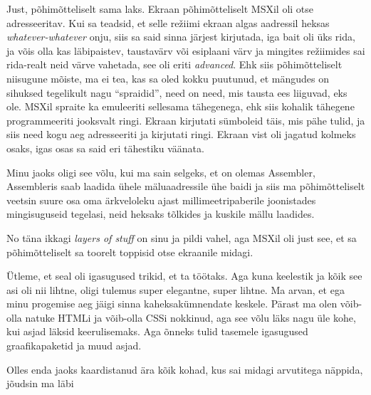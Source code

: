 Just, põhimõtteliselt sama laks. Ekraan põhimõtteliselt MSXil oli otse adresseeritav. Kui sa teadsid, et selle režiimi ekraan algas aadressil heksas \emph{whatever-whatever} onju, siis sa said sinna järjest kirjutada, iga bait oli üks rida, ja võis olla kas  läbipaistev, taustavärv või esiplaani värv ja mingites režiimides sai rida-realt neid värve vahetada, see oli eriti \emph{advanced}. Ehk siis põhimõtteliselt niisugune mõiste, ma ei tea, kas sa oled kokku puutunud, et mängudes on sihuksed tegelikult nagu \enquote{spraidid}, need on need, mis tausta ees liiguvad, eks ole. MSXil spraite ka emuleeriti sellesama tähegenega, ehk siis kohalik tähegene programmeeriti jooksvalt ringi. Ekraan kirjutati sümboleid täis, mis  pähe tulid, ja siis need kogu aeg adresseeriti ja kirjutati ringi. Ekraan vist oli jagatud kolmeks osaks, igas osas sa said eri tähestiku väänata.

Minu jaoks oligi see võlu, kui ma sain selgeks, et on olemas Assembler, Assembleris saab laadida ühele mäluaadressile ühe baidi ja siis ma põhimõtteliselt veetsin suure osa oma ärkveloleku ajast millimeetripaberile joonistades mingisuguseid tegelasi, neid heksaks tõlkides ja kuskile mällu laadides. 


No täna ikkagi \emph{layers of stuff} on sinu ja pildi vahel, aga MSXil oli just see, et sa põhimõtteliselt sa toorelt toppisid otse ekraanile midagi. 


Ütleme, et seal oli igasugused trikid, et ta töötaks. Aga kuna keelestik ja kõik see asi oli nii lihtne, oligi tulemus super elegantne, super  lihtne.  Ma arvan, et ega minu progemise aeg jäigi sinna kaheksakümnendate keskele. Pärast ma olen võib-olla natuke HTMLi ja võib-olla CSSi nokkinud, aga see võlu läks nagu üle kohe, kui asjad läksid keerulisemaks. Aga õnneks tulid tasemele igasugused graafikapaketid ja muud asjad. 


Olles enda jaoks kaardistanud ära kõik kohad, kus sai midagi arvutitega näppida, jõudsin ma läbi

